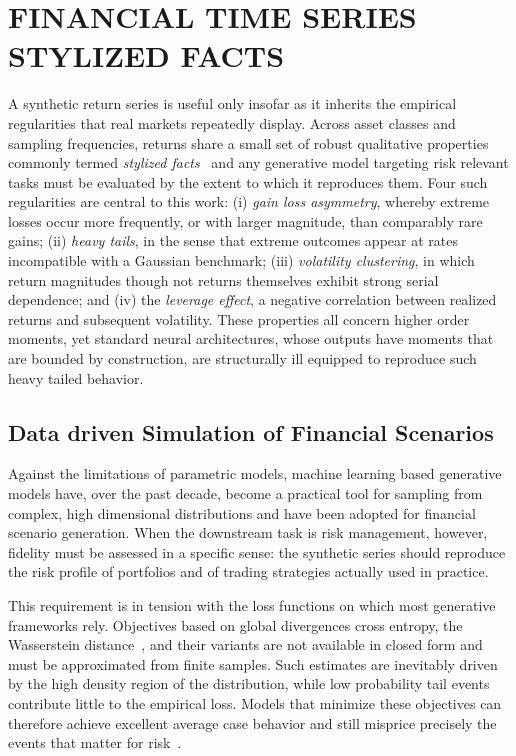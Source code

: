 \documentclass[sigconf,natbib=false]{acmart}
\begin{document}
\section{FINANCIAL TIME SERIES STYLIZED FACTS}

A synthetic return series is useful only insofar as it inherits the empirical regularities that real markets repeatedly display. Across asset classes and sampling frequencies, returns share a small set of robust qualitative properties commonly termed \emph{stylized facts}~\cite{Stylized_Facts_2, Stylized_Facts_1} and any generative model targeting risk relevant tasks must be evaluated by the extent to which it reproduces them. Four such regularities are central to this work: (i) \emph{gain loss asymmetry}, whereby extreme losses occur more frequently, or with larger magnitude, than comparably rare gains; (ii) \emph{heavy tails}, in the sense that extreme outcomes appear at rates incompatible with a Gaussian benchmark; (iii) \emph{volatility clustering}, in which return magnitudes though not returns themselves exhibit strong serial dependence; and (iv) the \emph{leverage effect}, a negative correlation between realized returns and subsequent volatility. These properties all concern higher order moments, yet standard neural architectures, whose outputs have moments that are bounded by construction, are structurally ill equipped to reproduce such heavy tailed behavior.


\subsection{Data driven Simulation of Financial Scenarios}

Against the limitations of parametric models, machine learning based generative models have, over the past decade, become a practical tool for sampling from complex, high dimensional distributions and have been adopted for financial scenario generation. When the downstream task is risk management, however, fidelity must be assessed in a specific sense: the synthetic series should reproduce the risk profile of portfolios and of trading strategies actually used in practice.

This requirement is in tension with the loss functions on which most generative frameworks rely. Objectives based on global divergences cross entropy, the Wasserstein distance~\cite{SigCWGAN}, and their variants are not available in closed form and must be approximated from finite samples. Such estimates are inevitably driven by the high density region of the distribution, while low probability tail events contribute little to the empirical loss. Models that minimize these objectives can therefore achieve excellent average case behavior and still misprice precisely the events that matter for risk~\cite{Cont26}.
\end{document}
